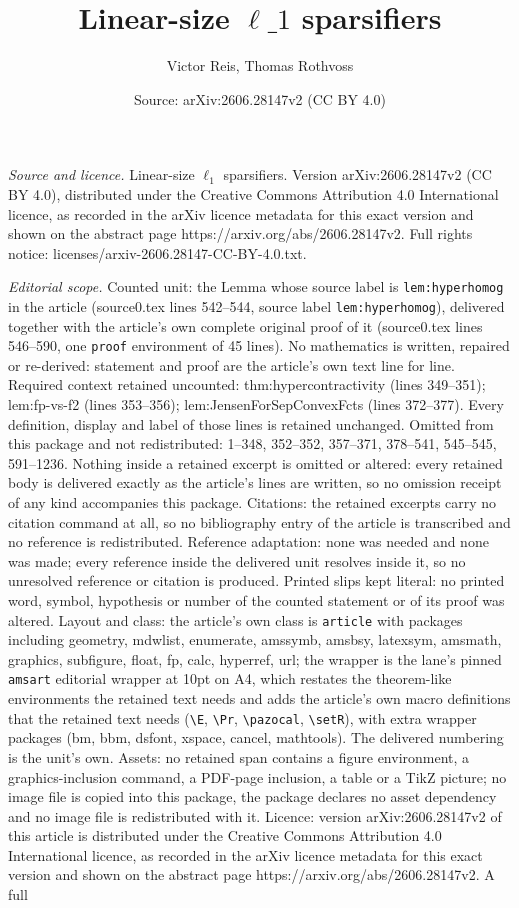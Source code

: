 \documentclass[10pt,a4paper]{amsart}
\title[Linear-size $\ell\_1$ sparsifiers]{Linear-size $\ell\_1$ sparsifiers}
\author{Victor Reis, Thomas Rothvoss}
\date{Source: arXiv:2606.28147v2 (CC BY 4.0)}
\begin{document}
\maketitle

\noindent\emph{Source and licence.} Linear-size $\ell_1$ sparsifiers. Version arXiv:2606.28147v2 (CC BY 4.0), distributed under the Creative Commons Attribution 4.0 International licence, as recorded in the arXiv licence metadata for this exact version and shown on the abstract page https://arxiv.org/abs/2606.28147v2. Full rights notice: licenses/arxiv-2606.28147-CC-BY-4.0.txt.\par\smallskip

\noindent\textit{Editorial scope.} Counted unit: the Lemma whose source label is \texttt{lem:hyperhomog} in the article (source0.tex lines 542--544, source label \texttt{lem:hyperhomog}), delivered together with the article's own complete original proof of it (source0.tex lines 546--590, one \texttt{proof} environment of 45 lines). No mathematics is written, repaired or re-derived: statement and proof are the article's own text line for line. Required context retained uncounted: thm:hypercontractivity (lines 349--351); lem:fp-vs-f2 (lines 353--356); lem:JensenForSepConvexFcts (lines 372--377). Every definition, display and label of those lines is retained unchanged. Omitted from this package and not redistributed: 1--348, 352--352, 357--371, 378--541, 545--545, 591--1236. Nothing inside a retained excerpt is omitted or altered: every retained body is delivered exactly as the article's lines are written, so no omission receipt of any kind accompanies this package. Citations: the retained excerpts carry no citation command at all, so no bibliography entry of the article is transcribed and no reference is redistributed. Reference adaptation: none was needed and none was made; every reference inside the delivered unit resolves inside it, so no unresolved reference or citation is produced. Printed slips kept literal: no printed word, symbol, hypothesis or number of the counted statement or of its proof was altered. Layout and class: the article's own class is \texttt{article} with packages including geometry, mdwlist, enumerate, amssymb, amsbsy, latexsym, amsmath, graphics, subfigure, float, fp, calc, hyperref, url; the wrapper is the lane's pinned \texttt{amsart} editorial wrapper at 10pt on A4, which restates the theorem-like environments the retained text needs and adds the article's own macro definitions that the retained text needs (\texttt{\textbackslash E}, \texttt{\textbackslash Pr}, \texttt{\textbackslash pazocal}, \texttt{\textbackslash setR}), with extra wrapper packages (bm, bbm, dsfont, xspace, cancel, mathtools). The delivered numbering is the unit's own. Assets: no retained span contains a figure environment, a graphics-inclusion command, a PDF-page inclusion, a table or a TikZ picture; no image file is copied into this package, the package declares no asset dependency and no image file is redistributed with it. Licence: version arXiv:2606.28147v2 of this article is distributed under the Creative Commons Attribution 4.0 International licence, as recorded in the arXiv licence metadata for this exact version and shown on the abstract page https://arxiv.org/abs/2606.28147v2. A full 
\end{document}
